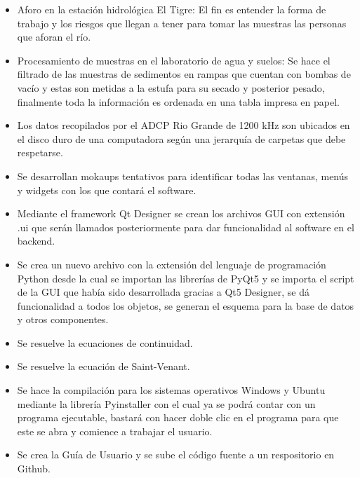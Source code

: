 \documentclass[12pt,a4paper]{report}
\begin{document}
\begin{itemize}
\item Aforo en la estación hidrológica El Tigre: El fin es entender la forma de trabajo y los riesgos que llegan a tener para tomar las muestras las personas que aforan el río.
\item Procesamiento de muestras en el laboratorio de agua y suelos: Se hace el filtrado de las muestras de sedimentos en rampas que cuentan con bombas de vacío y estas son metidas a la estufa para su secado y posterior pesado, finalmente toda la información es ordenada en una tabla impresa en papel.
\item Los datos recopilados por el ADCP Rio Grande de 1200 kHz son ubicados en el disco duro de una computadora según una jerarquía de carpetas que debe respetarse.
\item Se desarrollan mokaups tentativos para identificar todas las ventanas, menús y widgets con los que contará el software.
\item Mediante el framework Qt Designer se crean los archivos GUI con extensión .ui que serán llamados posteriormente para dar funcionalidad al software en el backend.
\item Se crea un nuevo archivo con la extensión del lenguaje de programación Python desde la cual se importan las librerías de PyQt5 y se importa el script de la GUI que había sido desarrollada gracias a Qt5 Designer, se dá funcionalidad a todos los objetos, se generan el esquema para la base de datos y otros componentes.
\item Se resuelve la ecuaciones de continuidad.
\item Se resuelve la ecuación de Saint-Venant.
\item Se hace la compilación para los sistemas operativos Windows y Ubuntu mediante la librería Pyinstaller con el cual ya se podrá contar con un programa ejecutable, bastará con hacer doble clic en el programa para que este se abra y comience a trabajar el usuario.
\item Se crea la Guía de Usuario y se sube el código fuente a un respositorio en Github.






\end{itemize}
\end{document}
